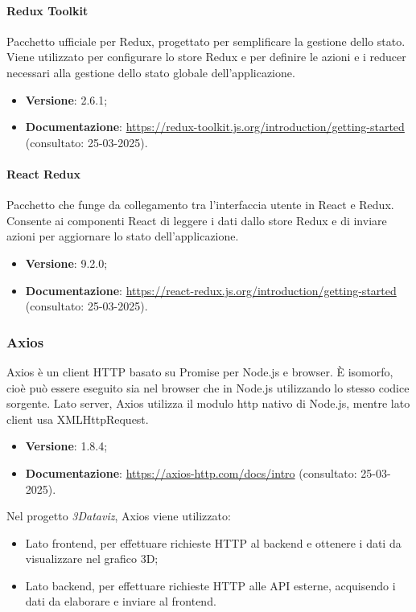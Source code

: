 \paragraph{Redux Toolkit}
Pacchetto ufficiale per Redux, progettato per semplificare la gestione dello
stato. Viene utilizzato per configurare lo store Redux e per definire le azioni
e i reducer necessari alla gestione dello stato globale dell'applicazione.
\begin{itemize}
    \item \textbf{Versione}: 2.6.1;
    \item \textbf{Documentazione}: \url{https://redux-toolkit.js.org/introduction/getting-started} (consultato:
          25-03-2025).
\end{itemize}

\paragraph{React Redux}
Pacchetto che funge da collegamento tra l'interfaccia utente in React e Redux.
Consente ai componenti React di leggere i dati dallo store Redux e di inviare
azioni per aggiornare lo stato dell'applicazione.
\begin{itemize}
    \item \textbf{Versione}: 9.2.0;
    \item \textbf{Documentazione}: \url{https://react-redux.js.org/introduction/getting-started} (consultato:
          25-03-2025).
\end{itemize}

\subsubsection{Axios}
Axios è un client HTTP basato su Promise per Node.js e browser. È isomorfo,
cioè può essere eseguito sia nel browser che in Node.js utilizzando lo stesso
codice sorgente. Lato server, Axios utilizza il modulo http nativo di Node.js,
mentre lato client usa XMLHttpRequest.
\begin{itemize}
    \item \textbf{Versione}: 1.8.4;
    \item \textbf{Documentazione}: \url{https://axios-http.com/docs/intro} (consultato:
          25-03-2025).
\end{itemize}
Nel progetto \textit{3Dataviz}, Axios viene utilizzato:
\begin{itemize}
    \item Lato frontend, per effettuare richieste HTTP al backend e ottenere i dati da
          visualizzare nel grafico 3D;
    \item Lato backend, per effettuare richieste HTTP alle API esterne, acquisendo i dati
          da elaborare e inviare al frontend.
\end{itemize}

